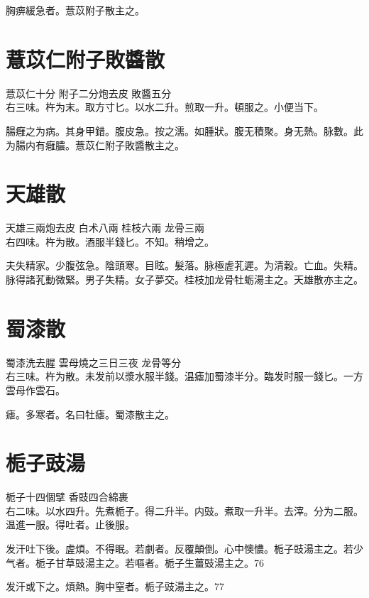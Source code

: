 胸痹緩急者。薏苡附子散主之。

\section{薏苡仁附子敗醬散}

薏苡仁{\scriptsize 十分} 附子{\scriptsize 二分炮去皮} 敗醬{\scriptsize 五分}\\
右三味。杵为末。取方寸匕。以水二升。煎取一升。頓服之。小便当下。

腸癰之为病。其身甲錯。腹皮急。按之濡。如腫狀。腹无積聚。身无熱。脉數。此为腸内有{\khaaitp 癰}膿。薏苡{\khaaitp 仁}附子敗醬散主之。

\section{天雄散}

天雄{\scriptsize 三兩炮去皮} 白术{\scriptsize 八兩} 桂枝{\scriptsize 六兩} 龙骨{\scriptsize 三兩}\\
右四味。杵为散。酒服半錢匕。不知。稍增之。

夫失精家。少腹弦急。陰頭寒。目眩。髮落。脉極虗芤遲。为清穀。亡血。失精。脉得諸芤動微緊。男子失精。女子夢交。桂枝加龙骨牡蛎湯主之。天雄散亦主之。

\section{蜀漆散}

蜀漆{\scriptsize 洗去腥} 雲母{\scriptsize 燒之三日三夜} 龙骨{\scriptsize 等分}\\
右三味。杵为散。未发前以漿水服半錢。温瘧加蜀漆半分。臨发时服一錢匕。{\scriptsize 一方雲母作雲石。}

瘧。多寒者。名曰牡瘧。蜀漆散主之。

\section{栀子豉湯}

栀子{\scriptsize 十四個擘} 香豉{\scriptsize 四合綿裹}\\
右二味。以水四升。先煮栀子。得二升半。内豉。煮取一升半。去滓。分为二服。温進一服。得吐者。止後服。

发汗吐下後。虗煩。不得眠。若劇者。反覆顛倒。心中懊憹。栀子{\khaaitp 豉}湯主之。若少气者。栀子甘草{\khaaitp 豉}湯主之。若嘔者。栀子生薑{\khaaitp 豉}湯主之。76

发汗或下之。煩熱。胸中窒者。栀子{\khaaitp 豉}湯主之。77

